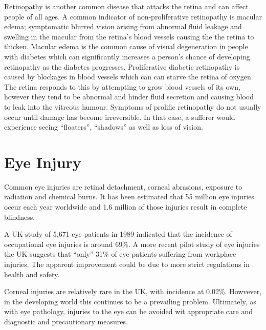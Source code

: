 Retinopathy is another common disease that attacks the retina and 
can affect people of all ages. A common indicator of non-proliferative
retinopathy is macular edema; symptomatic blurred vision arising from
abnormal fluid leakage and swelling in the \gls{macular} from the retina's
blood vessels causing the the retina to thicken.\cite{hee1995quantitative}
Macular edema is the common cause of visual degeneration in people
with diabetes which can significantly increases a person's chance of
developing retinopathy as the diabetes progresses.\cite{klein1984wisconsin}
Proliferative diabetic retinopathy is caused by blockages in blood vessels
which can can starve the retina of oxygen. The retina responds to this by
attempting to grow blood vessels of its own, however they tend to be
abnormal and hinder fluid secretion and causing blood to leak into the 
vitreous humour. Symptoms of prolific retinopathy do not usually occur 
until damage has become irreversible. In that case, a sufferer would
experience seeing \enquote{floaters}, \enquote{shadows} as well as
loss of vision.

\section{Eye Injury}

Common eye injuries are retinal detachment, corneal abrasions, exposure to
radiation and chemical burns. It has been estimated that 55 million eye injuries
occur each year worldwide and 1.6 million of those injuries result in complete
blindness.\cite{negrel1998global}

A UK study of 5,671 eye patients in 1989 indicated that the incidence of
occupational eye injuries is around 69\%.\cite{macewen1989eye} A more
recent pilot study of eye injuries the UK suggests that \enquote{only} 31\%
of eye patients suffering from workplace injuries.\cite{thompson2009occupational}
The apparent improvement could be due to more strict regulations in health
and safety.

Corneal injuries are relatively rare in the UK, with incidence at
0.02\%.\cite{macdonald2009surveillance} Howvever, in the developing
world this continues to be a prevailing problem.\cite{whitcher2001corneal}
Ultimately, as with eye pathology, injuries to the eye can be avoided wit
appropriate care and diagnostic and precautionary measures.

